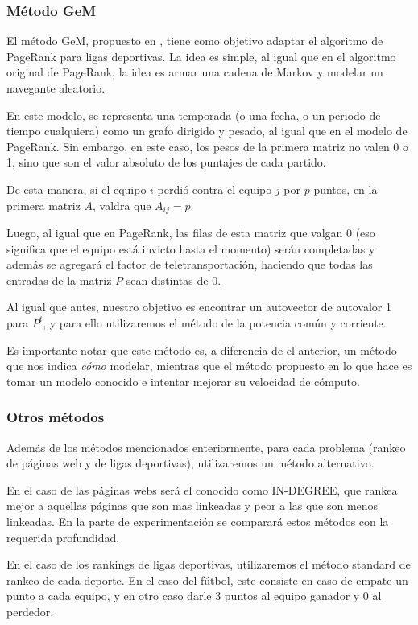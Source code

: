 \subsubsection{Método GeM}

El método GeM, propuesto en \cite{Govan2008}, tiene como objetivo adaptar el algoritmo de PageRank para ligas deportivas. La idea es simple, al igual que en el algoritmo original de PageRank, la idea es armar una cadena de Markov y modelar un navegante aleatorio.

En este modelo, se representa una temporada (o una fecha, o un periodo de tiempo cualquiera) como un grafo dirigido y pesado, al igual que en el modelo de PageRank. Sin embargo, en este caso, los pesos de la primera matriz no valen 0 o 1, sino que son el valor absoluto de los puntajes de cada partido.

De esta manera, si el equipo $i$ perdió contra el equipo $j$ por $p$ puntos, en la primera matriz $A$, valdra que $A_{ij} = p$. 

Luego, al igual que en PageRank, las filas de esta matriz que valgan 0 (eso significa que el equipo está invicto hasta el momento) serán completadas y además se agregará el factor de teletransportación, haciendo que todas las entradas de la matriz $P$ sean distintas de 0.

Al igual que antes, nuestro objetivo es encontrar un autovector de autovalor 1 para $P^t$, y para ello utilizaremos el método de la potencia común y corriente.

Es importante notar que este m\'etodo es, a diferencia de el anterior, un m\'etodo que nos indica \emph{cómo} modelar, mientras que el m\'etodo propuesto en \cite{Kamvar2003} lo que hace es tomar un modelo conocido e intentar mejorar su velocidad de cómputo.

\subsubsection{Otros m\'etodos}

Además de los m\'etodos mencionados enteriormente, para cada problema (rankeo de páginas web y de ligas deportivas), utilizaremos un m\'etodo alternativo. 

En el caso de las páginas webs será el conocido como IN-DEGREE, que rankea mejor a aquellas páginas que son mas linkeadas y peor a las que son menos linkeadas. En la parte de experimentación se comparará estos m\'etodos con la requerida profundidad.

En el caso de los rankings de ligas deportivas, utilizaremos el m\'etodo standard de rankeo de cada deporte. En el caso del fútbol, este consiste en caso de empate un punto a cada equipo, y en otro caso darle 3 puntos al equipo ganador y 0 al perdedor.


